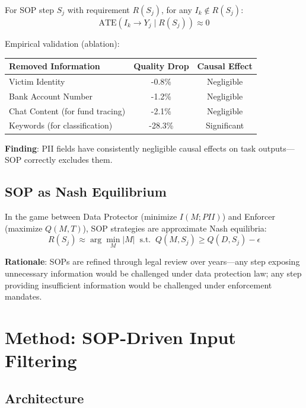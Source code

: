 \documentclass[letterpaper]{article}
\begin{document}
\begin{theorem}
For SOP step $S_j$ with requirement $R(S_j)$, for any $I_k \notin R(S_j)$:
$$\text{ATE}(I_k \rightarrow Y_j \mid R(S_j)) \approx 0$$
\end{theorem}

Empirical validation (ablation):
\begin{center}
\begin{tabular}{lcc}
\toprule
\textbf{Removed Information} & \textbf{Quality Drop} & \textbf{Causal Effect} \\
\midrule
Victim Identity & -0.8\% & Negligible \\
Bank Account Number & -1.2\% & Negligible \\
Chat Content (for fund tracing) & -2.1\% & Negligible \\
Keywords (for classification) & -28.3\% & Significant \\
\bottomrule
\end{tabular}
\end{center}

\textbf{Finding}: PII fields have consistently negligible causal effects on task outputs---SOP correctly excludes them.

\subsection{SOP as Nash Equilibrium}

\begin{theorem}
In the game between Data Protector (minimize $I(M; PII)$) and Enforcer (maximize $Q(M,T)$), SOP strategies are approximate Nash equilibria:
$$R(S_j) \approx \arg\min_M |M| \;\; \text{s.t.} \;\; Q(M, S_j) \geq Q(D, S_j) - \epsilon$$
\end{theorem}

\textbf{Rationale}: SOPs are refined through legal review over years---any step exposing unnecessary information would be challenged under data protection law; any step providing insufficient information would be challenged under enforcement mandates.

\section{Method: SOP-Driven Input Filtering}

\subsection{Architecture}
\end{document}
